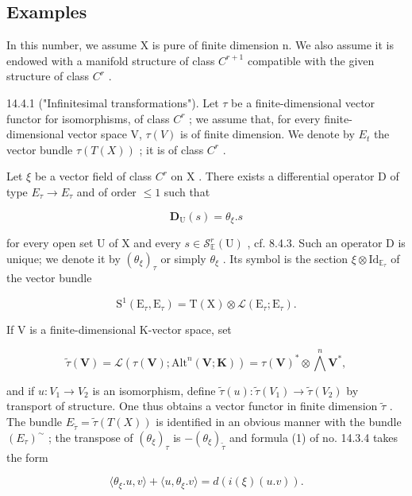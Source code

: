 \subsection{Examples}

In this number, we assume X is pure of finite dimension n. We also assume it is endowed with a manifold structure of class \(C^{r+1}\) compatible with the given structure of class \(C^{r}\) .

14.4.1 ("Infinitesimal transformations"). Let \(\tau\) be a finite-dimensional vector functor for isomorphisms, of class \(C^r\) ; we assume that, for every finite-dimensional vector space V, \(\tau(V)\) is of finite dimension. We denote by \(E_t\) the vector bundle \(\tau(T(X))\) ; it is of class \(C^r\) .

Let \(\xi\) be a vector field of class \(C^r\) on X . There exists a differential operator D of type \(E_{\tau} \to E_{\tau}\) and of order \(\leqslant1\) such that

\[
\mathbf {D} _ {\mathrm{U}} (s) = \theta_ {\xi}. s
\]

for every open set U of X and every \(s \in \mathcal{S}_{\mathbb{E}}^{r}(\mathrm{U})\) , cf. 8.4.3. Such an operator D is unique; we denote it by \((\theta_{\xi})_{\tau}\) or simply \(\theta_{\xi}\) . Its symbol is the section \(\xi \otimes \mathrm{Id}_{\mathbb{E}_{\tau}}\) of the vector bundle

\[
\mathrm{S} ^ {1} (\mathrm{E} _ {\tau}, \mathrm{E} _ {\tau}) = \mathrm{T} (\mathrm{X}) \otimes \mathscr {L} (\mathrm{E} _ {\tau}; \mathrm{E} _ {\tau}).
\]

If V is a finite-dimensional K-vector space, set

\[
\tilde {\tau} (\mathbf {V}) = \mathscr {L} (\tau (\mathbf {V}); \mathrm{Alt} ^ {n} (\mathbf {V}; \mathbf {K})) = \tau (\mathbf {V}) ^ {*} \otimes \bigwedge^ {n} \mathbf {V} ^ {*},
\]

and if \(u\colon V_{1}\to V_{2}\) is an isomorphism, define \(\tilde{\tau}(u)\colon\tilde{\tau}(V_{1})\to\tilde{\tau}(V_{2})\) by transport of structure. One thus obtains a vector functor in finite dimension \(\tilde{\tau}\) . The bundle \(E_{\tilde{\tau}}=\tilde{\tau}(T(X))\) is identified in an obvious manner with the bundle \((E_{\tau})^{\sim}\) ; the transpose of \((\theta_{\xi})_{\tau}\) is \(-( \theta_{\xi})_{\tilde{\tau}}\) and formula (1) of no. 14.3.4 takes the form

\[
\langle \theta_ {\xi}. u, v \rangle + \langle u, \theta_ {\xi}. v \rangle = d (i (\xi) (u. v)).
\]

